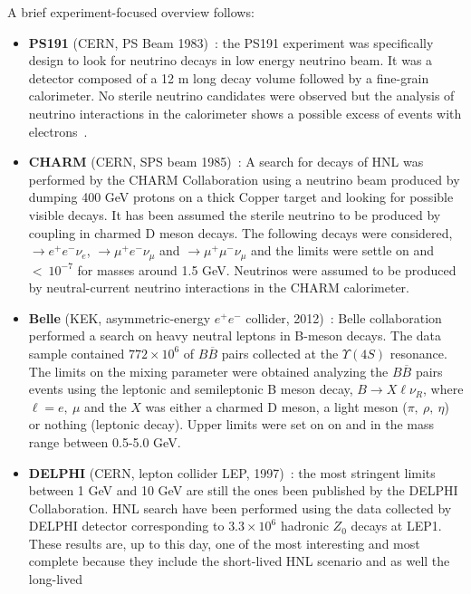 A brief experiment-focused overview follows:
\begin{itemize}
\item \textbf{PS191} (CERN, PS Beam 1983)~\cite{BERNARDI1988332}: the PS191
  experiment was specifically design to look for neutrino decays in
  low energy neutrino beam. It was a detector composed of a 12 m long
  decay volume followed by a fine-grain calorimeter. No sterile
  neutrino candidates were observed but the analysis of neutrino
  interactions in the calorimeter shows a possible excess of events
  with electrons~\cite{Vannucci:1985vs}.
\item \textbf{CHARM} (CERN, SPS beam 1985)~\cite{DORENBOSCH1986473}: A search
  for decays of HNL was performed by the CHARM Collaboration using a
  neutrino beam produced by dumping 400 GeV protons on a thick Copper
  target and looking for possible visible decays. It has been assumed
  the sterile neutrino to be produced by coupling in charmed D meson
  decays. The following decays were considered, \hnl $\rightarrow
  e^+e^-\nu_e$, $\rightarrow \mu^+e^-\nu_\mu$ and $\rightarrow
  \mu^+\mu^-\nu_\mu$ and the limits were settle on \mixpare and
  \mixparm $< \:10^{-7}$ for \hnl masses around 1.5 GeV. Neutrinos
  were assumed to be produced by neutral-current neutrino interactions
  in the CHARM calorimeter.
\item \textbf{Belle} (KEK, asymmetric-energy $e^+e^-$ collider, 2012)~\cite{Liventsev_2013}: Belle collaboration
  performed a search on heavy neutral leptons in B-meson
  decays. The data sample contained $772\times 10^6$ of $B\overline{B}$
  pairs collected at the $\Upsilon(4S)$ resonance. The limits
  on the mixing parameter were obtained analyzing the $B\overline{B}$ pairs
  events using the leptonic and semileptonic B meson decay,
  $B\rightarrow X\ell\nu_R$, where $\ell = e, \: \mu$ and the $X$ was
  either a charmed D meson, a light meson ($\pi, \: \rho, \: \eta$) or
  nothing (leptonic decay). Upper limits were set on on \mixpare and
  \mixparm in the mass range between 0.5-5.0 GeV. 
\item \textbf{DELPHI} (CERN, lepton collider LEP, 1997)~\cite{Abreu:1996pa}:
  the most stringent limits between 1 GeV and 10 GeV are still the ones
  been published by the DELPHI Collaboration. HNL search have been performed
  using the data collected by DELPHI detector corresponding to $3.3
  \times 10^6$ hadronic $Z_0$ decays at LEP1. These results are, up to
  this day, one of the most interesting and most complete because
  they include the short-lived HNL scenario and as well the long-lived

\end{itemize}
